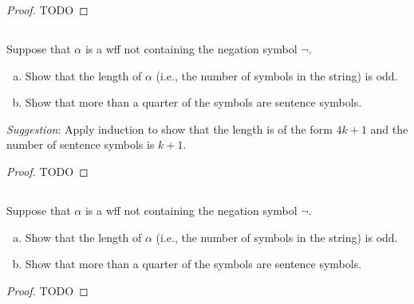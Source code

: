 \documentclass{report}
\begin{document}
  \begin{proof}
    TODO
  \end{proof}

\subsection{}%

  Suppose that $\alpha$ is a wff not containing the negation symbol $\neg$.
  \begin{enumerate}[(a)]
    \item Show that the length of $\alpha$ (i.e., the number of symbols in the
      string) is odd.
    \item Show that more than a quarter of the symbols are sentence symbols.
  \end{enumerate}
  \textit{Suggestion}: Apply induction to show that the length is of the form
    $4k + 1$ and the number of sentence symbols is $k + 1$.

  \begin{proof}
    TODO
  \end{proof}

\subsection{}%

  Suppose that $\alpha$ is a wff not containing the negation symbol $\neg$.
  \begin{enumerate}[(a)]
    \item Show that the length of $\alpha$ (i.e., the number of symbols in the
      string) is odd.
    \item Show that more than a quarter of the symbols are sentence symbols.
  \end{enumerate}

  \begin{proof}
    TODO
  \end{proof}
\end{document}
